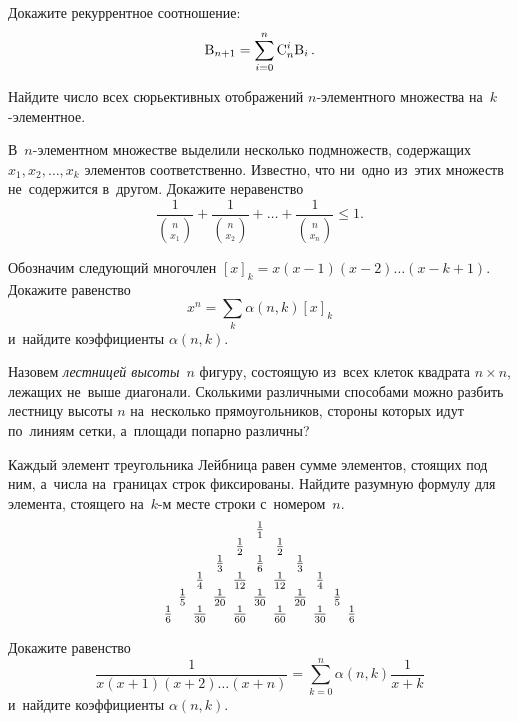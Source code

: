 \begin{problems}

\item
Докажите рекуррентное соотношение:
\[
    \mathrm{B}_{n + 1} = \sum_{i=0}^{n} \mathrm{C}_{n}^{i} \mathrm{B}_{i}
\, . \]

\item
Найдите число всех сюрьективных отображений $n$-элементного множества
на~$k$-эле\-мен\-тное.

\item
В~$n$-элементном множестве выделили несколько подмножеств, содержащих
$x_{1}, x_{2}, \ldots, x_{k}$ элементов соответственно.
Известно, что ни~одно из~этих множеств не~содержится в~другом.
Докажите неравенство
\[
    \frac{1}{\binom{n}{x_{1}}} + \frac{1}{\binom{n}{x_{2}}}
    + \ldots +
    \frac{1}{\binom{n}{x_{n}}}
\leq
    1
. \]

\item
Обозначим следующий многочлен $[x]_{k} = x (x - 1) (x - 2) \ldots (x - k + 1)$.
Докажите равенство
\[
    x^{n} = \sum_{k} \alpha(n, k) [x]_{k}
\]
и~найдите коэффициенты $\alpha(n, k)$.

\item
Назовем \emph{лестницей высоты~$n$} фигуру, состоящую из~всех клеток
квадрата $n \times n$, лежащих не~выше диагонали.
Сколькими различными способами можно разбить лестницу высоты $n$ на~несколько
прямоугольников, стороны которых идут по~линиям сетки, а~площади попарно
различны?

\item
Каждый элемент треугольника Лейбница равен сумме элементов, стоящих под ним,
а~числа на~границах строк фиксированы.
Найдите разумную формулу для элемента, стоящего на~$k$-м месте строки
с~номером~$n$.
\[ \arraycolsep=2pt
    \begin{array}{ccccccccccccc}
        & & & & & \frac{1}{1} \\
        & & & & \frac{1}{2} & & \frac{1}{2} \\
        & & & \frac{1}{3} & & \frac{1}{6} & & \frac{1}{3} \\
        & & \frac{1}{4} & & \frac{1}{12} & & \frac{1}{12} & & \frac{1}{4} \\
        & \frac{1}{5} & & \frac{1}{20} & & \frac{1}{30} &
            & \frac{1}{20} & & \frac{1}{5} \\
        \frac{1}{6} & & \frac{1}{30} & & \frac{1}{60} &
            & \frac{1}{60} & & \frac{1}{30} & & \frac{1}{6}
    \end{array}
\]

\item
Докажите равенство
\[
    \frac{1}{x (x + 1) (x + 2) \ldots (x + n)}
=
    \sum_{k=0}^{n}
        \alpha(n, k) \frac{1}{x + k}
\]
и~найдите коэффициенты $\alpha(n, k)$.

\end{problems}

\endgroup %

